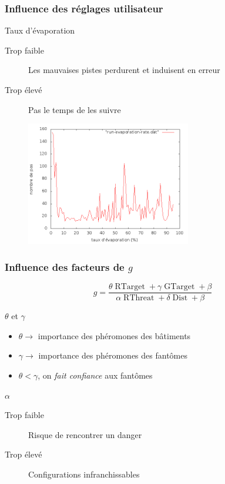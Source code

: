 \documentclass{beamer}
\begin{document}
\begin{frame}

  \frametitle{Influence des réglages utilisateur}

  \begin{block}{Taux d'évaporation}
    \begin{description}
      \item[Trop faible]{Les mauvaises pistes perdurent et induisent
        en erreur}
      \item[Trop élevé]{Pas le temps de les suivre}
    \end{description}
  \end{block}

  \vfill

  \begin{figure}
    \centering
    \includegraphics[width=7.2cm]{run-evaporation-rate.png}
  \end{figure}

\end{frame}

\begin{frame}

  \frametitle{Influence des facteurs de $g$}

  $$g = \frac{ \theta \operatorname{RTarget} + \gamma \operatorname{GTarget} + \beta}{\alpha \operatorname{RThreat} + \delta \operatorname{Dist} + \beta}$$

  \vfill

  \begin{block}{$\theta$ et $\gamma$}
    \begin{itemize}
    \item{$\theta \rightarrow$ importance des phéromones des
      bâtiments}
    \item{$\gamma \rightarrow$ importance des phéromones des
      fantômes}
    \item{$\theta < \gamma$, on \textit{fait confiance} aux
      fantômes}
    \end{itemize}
  \end{block}

  \vfill

  \begin{block}{$\alpha$}
    \begin{description}
    \item[Trop faible]{Risque de rencontrer un danger}
    \item[Trop élevé]{Configurations infranchissables}
    \end{description}
  \end{block}

\end{frame}
\end{document}

